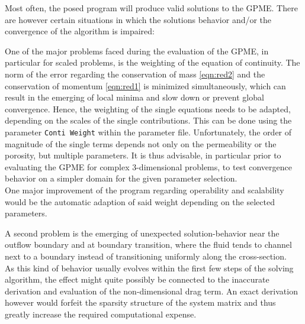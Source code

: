 \documentclass{article}
\begin{document}
Most often, the posed program will produce valid solutions to the GPME. There are however certain situations in which the solutions behavior and/or the convergence of the algorithm is impaired:

One of the major problems faced during the evaluation of the GPME, in particular for scaled problems, is the weighting of the equation of continuity. The norm of the error regarding the conservation of mass \eqref{eqn:red2} and the conservation of momentum \eqref{eqn:red1} is minimized simultaneously, which can result in the emerging of local minima and slow down or prevent global convergence. 
Hence, the weighting of the single equations needs to be adapted, depending on the scales of the single contributions. This can be done using the parameter \texttt{Conti Weight} within the parameter file. Unfortunately, the order of magnitude of the single terms depends not only on the permeability or the porosity, but multiple parameters. It is thus advisable, in particular prior to evaluating the GPME for complex 3-dimensional problems, to test convergence behavior on a simpler domain for the given parameter selection.\\
One major improvement of the program regarding operability and scalability would be the automatic adaption of said weight depending on the selected parameters.

A second problem is the emerging of unexpected solution-behavior near the outflow boundary and at boundary transition, where the fluid tends to channel next to a boundary instead of transitioning uniformly along the cross-section.\\
As this kind of behavior usually evolves within the first few steps of the solving algorithm, the effect might quite possibly be connected to the inaccurate derivation and evaluation of the non-dimensional drag term. An exact derivation however would forfeit the sparsity structure of the system matrix and thus greatly increase the required computational expense.

\pagebreak
{}
{}

\nocite{*} %


\cleardoublepage
{}
{}
\printindex            %
\end{document}
